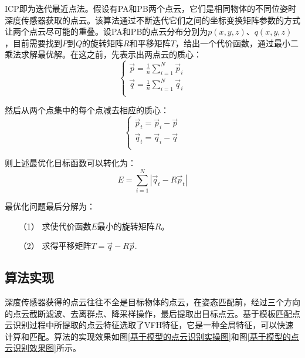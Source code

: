 \documentclass[fontset=fandol,type=bachelor,campus=harbin]{hithesisbook}
\begin{document}
ICP即为迭代最近点法。假设有PA和PB两个点云，它们是相同物体的不同位姿时深度传感器获取的点云。该算法通过不断迭代它们之间的坐标变换矩阵参数的方式让两个点云尽可能的重叠\cite{chetverikov2002trimmed}。设PA和PB的点云分布分别为$p\left( x,y,z \right) $、$q\left( x,y,z \right) $，目前需要找到$P$到$Q$的旋转矩阵$R$和平移矩阵$T$，给出一个代价函数，通过最小二乘法求解最优解。在这之前，先表示出两点云的质心：
\begin{equation}
\left\{ \begin{array}{c}
	\vec{p}=\frac{1}{n}\sum_{i=1}^N{\vec{p}_i}\\
	\vec{q}=\frac{1}{n}\sum_{i=1}^N{\vec{q}_i}\\
\end{array} \right. 
\label{点云质心描述1} 
\end{equation}


然后从两个点集中的每个点减去相应的质心：
\begin{equation}
\left\{ \begin{array}{c}
	\vec{p}_t=\vec{p}_i-\vec{p}\\
	\vec{q}_t=\vec{q}_i-\vec{q}\\
\end{array} \right. 
\label{点云质心描述2} 
\end{equation}


则上述最优化目标函数可以转化为：
\begin{equation}
E=\sum_{i=1}^N{\left| \vec{q}_t-R\vec{p}_t \right|}
\label{ICP代价函数} 
\end{equation}


最优化问题最后分解为：
\begin{itemize}
\item[（1）]
求使代价函数$E$最小的旋转矩阵$R$。
\item[（2）]
求得平移矩阵$T=\vec{q}-R\vec{p}$.
\end{itemize}

\subsection{算法实现}
深度传感器获得的点云往往不全是目标物体的点云，在姿态匹配前，经过三个方向的点云截断滤波、去离群点、降采样操作，最后提取出目标点云。基于模板匹配点云识别过程中所提取的点云特征选取了VFH特征，它是一种全局特征，可以快速计算和匹配。算法的实现效果如图\ref{基于模型的点云识别实操图}和图\ref{基于模型的点云识别效果图}所示。
\end{document}
